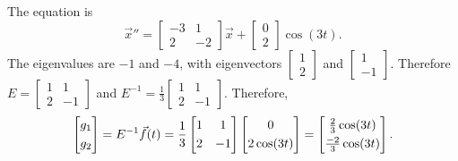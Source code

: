 \documentclass{ximera}
\begin{document}
\begin{exampleSol}
    The equation is
    \begin{equation*}
        {\vec{x}}'' =
        \begin{bmatrix}
            -3 & 1 \\
            2 & -2
        \end{bmatrix}
        \vec{x} + 
        \begin{bmatrix}
            0 \\ 
            2
        \end{bmatrix}
        \cos (3 t) .
    \end{equation*}
    The eigenvalues are $-1$ and $-4$, with eigenvectors 
    $\left[ \begin{smallmatrix} 1 \\ 2 \end{smallmatrix} \right]$ and
    $\left[ \begin{smallmatrix} 1 \\ -1 \end{smallmatrix} \right]$.
    Therefore $E = \left[ \begin{smallmatrix} 1 & 1 \\ 2 & -1 \end{smallmatrix} \right]$
    and $E^{-1} = \frac{1}{3} \left[ \begin{smallmatrix} 1 & 1 \\ 2 & -1 \end{smallmatrix} \right]$.
    Therefore,
    \begin{equation*}
        \begin{bmatrix}
            g_1 \\
            \noalign{\smallskip}
            g_2
        \end{bmatrix}
        = E^{-1} \vec{f}(t) =
        \frac{1}{3}
        \begin{bmatrix} 
            1 & 1 \\
            \noalign{\smallskip}
            2 & -1 
        \end{bmatrix}
        \begin{bmatrix} 
            0 \\
            \noalign{\smallskip}
            2\cos (3t) 
        \end{bmatrix}
        =
        \begin{bmatrix} 
            \frac{2}{3}\cos (3t) \\
            \noalign{\smallskip}
            \frac{-2}{3}\cos (3t) 
        \end{bmatrix} .

\end{equation*}
\end{exampleSol}
\end{document}
